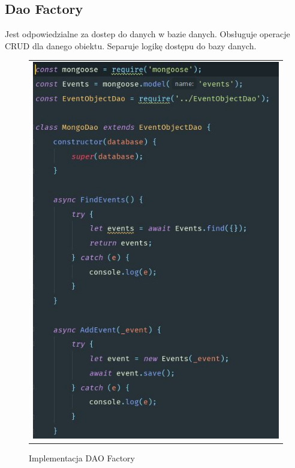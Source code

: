 \documentclass{sprawozdanie-agh}
\begin{document}
	\subsection{Dao Factory}
	
	Jest odpowiedzialne za dostep do danych w bazie danych. Obsługuje operacje CRUD dla danego	obiektu. Separuje logikę dostępu do bazy danych.
	
	\begin{figure}[H] 
		\centering
		\begin{tabular}{c}
			\includegraphics[width=.75\textwidth]{mongodao}
		\end{tabular} 
		\caption{Implementacja DAO Factory}
	\end{figure}
\end{document}
